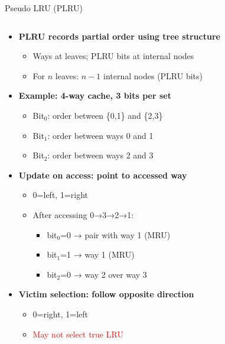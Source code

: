 \documentclass[aspectratio=169,12pt]{beamer}
\begin{document}
\begin{frame}{Pseudo LRU (PLRU)}
\begin{columns}
\begin{column}{0.6\textwidth}
\begin{itemize}
  \item \textbf{PLRU records partial order using tree structure}
  \begin{itemize}
    \item Ways at leaves; PLRU bits at internal nodes
    \item For $n$ leaves: $n-1$ internal nodes (PLRU bits)
  \end{itemize}
  
  \vspace{0.2cm}
  
  \item \textbf{Example: 4-way cache, 3 bits per set}
  \begin{itemize}
    \item Bit$_0$: order between \{0,1\} and \{2,3\}
    \item Bit$_1$: order between ways 0 and 1
    \item Bit$_2$: order between ways 2 and 3
  \end{itemize}
  
  \vspace{0.2cm}
  
  \item \textbf{Update on access: point to accessed way}
  \begin{itemize}
    \item 0=left, 1=right
    \item After accessing 0→3→2→1:
    \begin{itemize}
      \item bit$_0$=0 → pair with way 1 (MRU)
      \item bit$_1$=1 → way 1 (MRU)
      \item bit$_2$=0 → way 2 over way 3
    \end{itemize}
  \end{itemize}
  
  \vspace{0.2cm}
  
  \item \textbf{Victim selection: follow opposite direction}
  \begin{itemize}
    \item 0=right, 1=left
    \item \textcolor{red}{May not select true LRU}
  \end{itemize}
\end{itemize}
\end{column}


\end{columns}
\end{frame}
\end{document}
